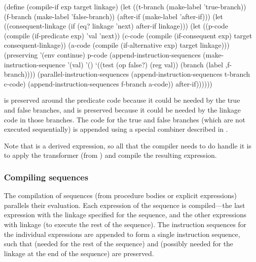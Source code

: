 \begin{codeBlock}
(define (compile-if exp target linkage)
  (let ((t-branch (make-label 'true-branch))
        (f-branch (make-label 'false-branch))
        (after-if (make-label 'after-if)))
    (let ((consequent-linkage
            (if (eq? linkage 'next)
                after-if
                linkage)))
      (let ((p-code
              (compile (if-predicate exp)
                       'val
                       'next))
            (c-code
              (compile
                (if-consequent exp) target
                consequent-linkage))
            (a-code
              (compile (if-alternative exp)
                       target
                       linkage)))
        (preserving
          '(env continue)
          p-code
          (append-instruction-sequences
            (make-instruction-sequence
              '(val) '()
              `((test (op false?) (reg val))
                (branch (label ,f-branch))))
            (parallel-instruction-sequences
              (append-instruction-sequences
                t-branch c-code)
              (append-instruction-sequences
                f-branch a-code))
            after-if))))))
\end{codeBlock}

\noindent
{} is preserved around the predicate code because it could be needed by
the true and false branches, and  is preserved because it could
be needed by the linkage code in those branches.  The code for the true and
false branches (which are not executed sequentially) is appended using a
special combiner  described in
.

Note that  is a derived expression, so all that the compiler needs
to do handle it is to apply the  transformer (from
) and compile the resulting  expression.

\subsubsection*{Compiling sequences}

The compilation of sequences (from procedure bodies or explicit 
expressions) parallels their evaluation.  Each expression of the sequence is
compiled---the last expression with the linkage specified for the sequence, and
the other expressions with linkage  (to execute the rest of the
sequence).  The instruction sequences for the individual expressions are
appended to form a single instruction sequence, such that  (needed
for the rest of the sequence) and  (possibly needed for the
linkage at the end of the sequence) are preserved.

